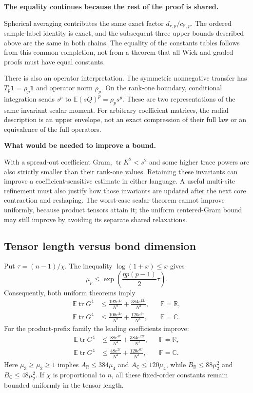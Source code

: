 \documentclass[11pt]{article}
\numberwithin{equation}{section}
\theoremstyle{definition}\newtheorem{definition}[theorem]{Definition}
\theoremstyle{remark}\newtheorem{remark}[theorem]{Remark}
\newcommand{\R}{\mathbb R}\newcommand{\E}{\mathbb E}\newcommand{\Prob}{\mathbb P}
\newcommand{\tr}{\operatorname{tr}}\newcommand{\Ent}{\operatorname{Ent}}
\newcommand{\one}{\mathbf1}\newcommand{\F}{\mathbb F}
\newcommand{\step}[1]{\par\addvspace{.65\baselineskip}\Needspace{4\baselineskip}\noindent\textbf{#1}\par\nobreak\smallskip}
\newcommand{\C}{\mathbb C}
\begin{document}
\step{The equality continues because the rest of the proof is shared.}
Spherical averaging contributes the same exact factor $d_{r,p}/c_{\F,p}$.
The ordered sample-label identity is exact, and the subsequent three upper
bounds described above are the same in both chains. The equality of the
constants tables follows from this common completion, not from a theorem that
all Wick and graded proofs must have equal constants.

There is also an operator interpretation. The symmetric nonnegative transfer
has $T_p\one=\rho_p\one$ and operator norm $\rho_p$. On the rank-one boundary,
conditional integration sends $s^p$ to $\E(sQ)^p=\rho_ps^p$. These are two
representations of the same invariant scalar moment. For arbitrary coefficient
matrices, the radial description is an upper envelope, not an exact compression
of their full law or an equivalence of the full operators.

\step{What would be needed to improve a bound.}
With a spread-out coefficient Gram, $\tr K^2<s^2$ and some higher trace powers
are also strictly smaller than their rank-one values. Retaining these invariants
can improve a coefficient-sensitive estimate in either language. A useful
multi-site refinement must also justify how those invariants are updated after
the next core contraction and reshaping. The worst-case scalar theorem cannot
improve uniformly, because product tensors attain it; the uniform centered-Gram
bound may still improve by avoiding its separate shared relaxations.

\subsection{Tensor length versus bond dimension}
Put $\tau=(n-1)/\chi$. The inequality $\log(1+x)\le x$ gives
\begin{equation}\label{eq:muexp}
 \mu_p\le\exp\left(\frac{\eta p(p-1)}2\tau\right).
\end{equation}
Consequently, both uniform theorems imply
\begin{align}
 \E\tr G^4&\le\frac{192e^{4\tau}}{N^2}
                    +\frac{384e^{12\tau}}{N^3},&&\F=\R,\label{eq:uniformexpR}\\
 \E\tr G^4&\le\frac{108e^{2\tau}}{N^2}
                    +\frac{120e^{6\tau}}{N^3},&&\F=\C.\label{eq:uniformexpC}
\end{align}
For the product-prefix family the leading coefficients improve:
\begin{align}
 \E\tr G^4&\le\frac{88e^{4\tau}}{N^2}
                    +\frac{384e^{12\tau}}{N^3},&&\F=\R,\\
 \E\tr G^4&\le\frac{48e^{2\tau}}{N^2}
                    +\frac{120e^{6\tau}}{N^3},&&\F=\C.
\end{align}
Here $\mu_3\ge\mu_2\ge1$ implies $A_{\R}\le384\mu_4$ and
$A_{\C}\le120\mu_4$, while $B_{\R}\le88\mu_2^2$ and
$B_{\C}\le48\mu_2^2$. If $\chi$ is proportional to $n$, all these fixed-order
constants remain bounded uniformly in the tensor length.
\end{document}
